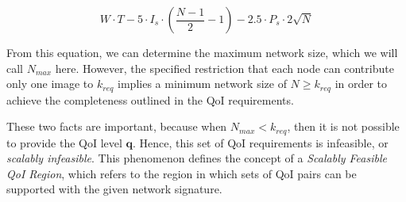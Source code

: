 \begin{equation}
	W \cdot T - 5 \cdot I_s \cdot (\frac{N-1}{2}-1) - 2.5 \cdot P_s \cdot 2 \sqrt{N}
\end{equation}

From this equation, we can determine the maximum network size, which we will call $N_{max}$ here.  However, the specified restriction that each node can contribute only one image to $k_{req}$ implies a minimum network size of $N \geq k_{req}$ in order to achieve the completeness outlined in the QoI requirements. 

These two facts are important, because when $N_{max} < k_{req}$, then it is not possible to provide the QoI level $\mathbf{q}$.  Hence, this set of QoI requirements is infeasible, or \emph{scalably infeasible}.  This phenomenon defines the concept of a \emph{Scalably Feasible QoI Region}, which refers to the region in which sets of QoI pairs can be supported with the given network signature.  

